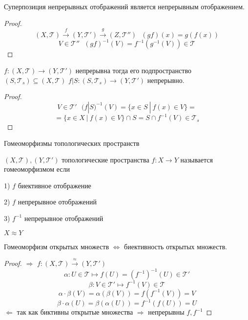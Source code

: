 \begin{theorem}
  Суперпозиция непрерывных отображений является непрерывным отображением.
\end{theorem}

\begin{proof}
  $$
  (X, \mathcal{T}) \stackrel{f}{\to} (Y, \mathcal{T}') \stackrel{g}{\to}
  (Z, \mathcal{T}'') ~~~ (gf)(x) = g(f(x))
  $$
  $$
  V \in \mathcal{T}'' ~~~ (gf)^{-1}(V) =
  f^{-1}(g^{-1}(V)) \in \mathcal{T}
  $$
\end{proof}

\begin{theorem}
  $f: (X, \mathcal{T}) \to (Y, \mathcal{T}')$ непрерывна тогда его
  подпространство $(S, \mathcal{T}_s) \subseteq (X, \mathcal{T})$
  $f|S : (S, \mathcal{T}_s) \to (Y, \mathcal{T}')$ непрерывно.
\end{theorem}

\begin{proof}
  $$
  V \in \mathcal{T}' ~~~ (f | S)^{-1}(V) = \{ x \in S ~ | ~ f(x) \in V \} =
  $$
  $$
  = \{x \in X ~ | ~ f(x) \in V\} \cap S = S \cap f^{-1}(V) \in \mathcal{T}_s
  $$
\end{proof}

\begin{title}[\Large]
  Гомеоморфизмы топологических пространств
\end{title}

\begin{define}[гомеоморфизма]
  $(X, \mathcal{T}), (Y, \mathcal{T}')$ топологические пространства
  $f: X \to Y$ называется гомеоморфизмом если

  1) $f$ биективное отображение

  2) $f$ непрерывное отображений

  3) $f^{-1}$ непрерывное отображений

  $X \approx Y$
\end{define}

\begin{theorem}
  Гомеоморфизм открытых множеств $\Leftrightarrow$ биективность открытых
  множеств.
\end{theorem}

\begin{proof}
  $\Rightarrow$ $f:(X, \mathcal{T}) \stackrel{\approx}{\to} (Y, \mathcal{T}')$
  $$
  \alpha : U \in \mathcal{T} \mapsto f(U) = (f^{-1})^{-1}(U) \in \mathcal{T}'
  $$
  $$
  \beta : V \in \mathcal{T}' \mapsto f^{-1}(V) \in \mathcal{T}
  $$
  $$
  \alpha \cdot \beta (V) = \alpha(\beta(V)) = f(f^{-1}(V)) = V
  $$
  $$
  \beta \cdot \alpha (U) = \beta(\alpha(U)) = f^{-1}(f(U)) = U
  $$
  $\Leftarrow$ так как биктивны открытые множества
  $\Rightarrow$ непрерывны $f, f^{-1}$
\end{proof}